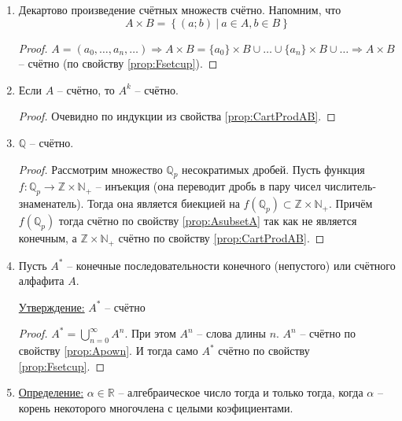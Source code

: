 \documentclass[a4paper, 12pt]{article}
\newcommand{\definition}{\underline{Определение:} }
\newcommand{\statement}{\underline{Утверждение:} }
\newcommand{\Z}{\mathbb{Z}}
\newcommand{\N}{\mathbb{N}}
\newcommand{\Q}{\mathbb{Q}}
\newcommand{\R}{\mathbb{R}}
\begin{document}
\begin{enumerate}
      \item
          \label{prop:CartProdAB}
          Декартово произведение счётных множеств счётно.
          Напомним, что \[A \times B = \left\{ (a; b)\ |\ a \in A, b \in B \right\}\]
          \begin{proof}
              $A = (a_0, \ldots, a_n, \ldots) \Rightarrow 
              A \times B = \{a_0\} \times B \cup \ldots \cup
              \{a_n\} \times B \cup \ldots \Rightarrow A \times B $ -- счётно
              (по свойству \ref{prop:Fsetcup}). 
          \end{proof}
      \item 
          \label{prop:Apown}
          Если $A$ -- счётно, то $A^k$ -- счётно.
          \begin{proof}
              Очевидно по индукции из свойства \ref{prop:CartProdAB}.
          \end{proof}
      \item $\Q$ -- счётно.
          \begin{proof}
              Рассмотрим множество $\Q_p$ несократимых дробей. 
              Пусть функция $f: \Q_p \to \Z \times \N_+$ -- инъекция
              (она переводит дробь в пару чисел числитель-знаменатель).
              Тогда она является биекцией на $f(\Q_p) \subset \Z \times \N_+$. 
              Причём $f(\Q_p)$ тогда счётно по свойству \ref{prop:AsubsetA}
              так как не является конечным, а $\Z \times \N_+$ счётно
              по свойству \ref{prop:CartProdAB}.
          \end{proof}
      \item Пусть $A^*$ -- конечные последовательности конечного (непустого) или 
          счётного алфафита $A$.

          \statement $A^*$ -- счётно
          \begin{proof}
              $A^* = \bigcup\limits_{n=0}^{\infty} A^n$. При этом $A^n$ -- слова длины $n$.
              $A^n$ -- счётно по свойству \ref{prop:Apown}. И тогда само $A^*$ счётно
              по свойству \ref{prop:Fsetcup}.
          \end{proof}
      \item \definition $\alpha \in \R$ -- алгебраическое число тогда и только тогда, 
          когда $\alpha$ -- корень некоторого многочлена с целыми коэфициентами.


\end{enumerate}
\end{document}

